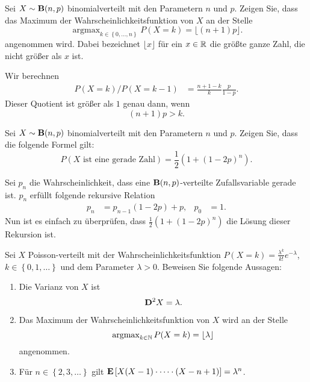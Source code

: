 Sei $X \sim \mathbf B(n,p)$ binomialverteilt mit den Parametern $n$ und $p$. Zeigen
Sie, dass das Maximum der Wahrscheinlichkeitsfunktion von $X$ an der Stelle
\begin{equation*}
    \operatorname{argmax}_{k\in \left\{ 0,\dots ,n \right\}} P(X=k) = \lfloor (n+1)p \rfloor.
\end{equation*}
angenommen wird. Dabei bezeichnet $\lfloor x \rfloor$ für ein $x\in\mathbb R$ die
größte ganze Zahl, die nicht größer als $x$ ist. 

\solution 
Wir berechnen
\begin{align*}
    P(X=k)/P(X=k-1) &= \frac{n+1-k}{k} \frac{p}{1-p}.
\end{align*}
Dieser Quotient ist größer als $1$ genau dann, wenn 
\begin{equation*}
    (n+1)p > k. 
\end{equation*}


Sei $X \sim \mathbf B(n,p)$ binomialverteilt mit den Parametern $n$ und $p$. Zeigen
Sie, dass die folgende Formel gilt:
\begin{equation*}
    P\left( X \text{ ist eine gerade Zahl} \right) = \frac{1}{2}\left( 1 + (1-2p)^n \right). 
\end{equation*}

\solution 
Sei $p_n$ die Wahrscheinlichkeit, dass eine
$\mathbf B(n,p)$-verteilte Zufallsvariable gerade ist. $p_n$ erfüllt folgende rekursive
Relation
\begin{align*}
    p_n &= p_{n-1}(1-2p) + p, &  p_0 &= 1.
\end{align*}
Nun ist es einfach zu überprüfen, dass $\frac{1}{2}(1+ (1-2p)^n)$ die Lösung
dieser Rekursion ist. 


 Sei $X$
Poisson-verteilt mit der Wahrscheinlichkeitsfunktion $P(X = k) =
\frac{\lambda^k}{k!} e^{-\lambda}$, $k\in \left\{ 0,1,\dots \right\}$ und dem
Parameter $\lambda>0$. Beweisen Sie folgende Aussagen: 
\begin{enumerate}
    \item Die Varianz von $X$ ist 
        \begin{equation*}
            \mathbf D^2 X = \lambda.
        \end{equation*}
    \item  Das Maximum der Wahrscheinlichkeitsfunktion von $X$ wird an der Stelle
        \begin{equation*}
            \operatorname{argmax}_{k\in \mathbb N} P(X= k) = \lfloor \lambda \rfloor 
        \end{equation*}
        angenommen.

    \item Für $n\in \left\{ 2,3,\dots  \right\}$ gilt 
        $\mathbf E \left[ X(X-1)\cdot\dots\cdot (X-n+1) \right] = \lambda^n$.
\end{enumerate}

